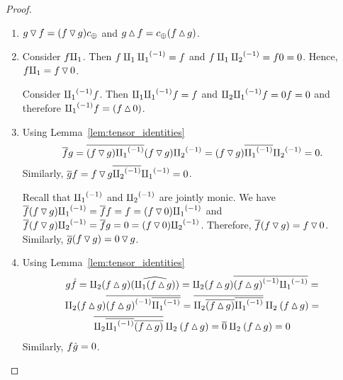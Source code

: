 \begin{proof}
  \prepprooflist
  \begin{enumerate}[{(}i{)}]
    \item $g \tjdown f = (f \tjdown g)\comp $ and $g \tjup f = \comp(f\tjup g)$.
    \item Consider $f \cpa$. Then $f \cpa \icpa = f$ and
      $f \cpa \icpb = f 0 = 0$. Hence, $f \cpa = f \tjdown 0$.

      Consider $\icpa f$. Then $\cpa \icpa f = f$ and
      $\cpb \icpa f = 0 f = 0$ and therefore $\icpa f = (f\tjup 0)$.
    \item Using Lemma~\ref{lem:tensor_identities}
      \[
        \rst{f}g = \rst{(f\tjdown g)\icpa} (f\tjdown g)\icpb =
          (f\tjdown g) \rst{\icpa} \icpb = 0.
      \]
      Similarly, $\rst{g}f = f\tjdown g \rst{\icpb}\icpa = 0$.

      Recall that $\icpa$ and $\icpb$ are jointly monic. We have
      $\rst{f}(f \tjdown g) \icpa = \rst{f} f = f = (f\tjdown 0) \icpa$ and
      $\rst{f}(f \tjdown g) \icpb = \rst{f}g = 0= (f\tjdown 0) \icpb$.
      Therefore, $\rst{f}(f \tjdown g) = f \tjdown 0$. Similarly,
      $\rst{g}(f \tjdown g) = 0 \tjdown g$.
    \item Using Lemma~\ref{lem:tensor_identities}
      \begin{multline*}
        g\rg{f} = \cpb(f\tjup g)\wrg{(\cpa(f\tjup g))}  =
          \cpb(f\tjup g) \rst{\inv{(f\tjup g)}\icpa} =\\
          \cpb(f\tjup g) \rst{\inv{(f\tjup g)}\rst{\icpa}} =
          \rst{\cpb \rst{(f\tjup g)} \rst{\icpa}}\cpb(f\tjup g) = \\
          \rst{\cpb \rst{\icpa}\rst{(f\tjup g)} }\cpb(f\tjup g) =
          \rst{0}\cpb(f\tjup g) = 0
      \end{multline*}
      Similarly, $f\rg{g} =  0$.


\end{enumerate}
\end{proof}
